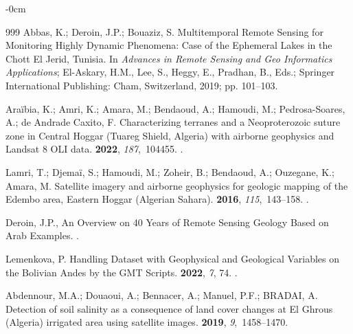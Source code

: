 \documentclass[asi,article,accept,pdftex,moreauthors]{Definitions/mdpi}
\begin{document}
\begin{adjustwidth}{-\extralength}{0cm}
\begin{thebibliography}{999}
Abbas, K.; Deroin, J.P.; Bouaziz, S.
\newblock Multitemporal Remote Sensing for Monitoring Highly Dynamic Phenomena:
  Case of the Ephemeral Lakes in the Chott El Jerid, Tunisia.
\newblock In \emph{Advances in Remote Sensing and Geo Informatics
  Applications}; El-Askary, H.M., Lee, S., Heggy, E., Pradhan, B., Eds.;
  Springer International Publishing: Cham,  Switzerland, 2019; pp. 101--103.

Araïbia, K.; Amri, K.; Amara, M.; Bendaoud, A.; Hamoudi, M.; Pedrosa-Soares,
  A.; {de Andrade Caxito}, F.
\newblock Characterizing terranes and a Neoproterozoic suture zone in Central
  Hoggar (Tuareg Shield, Algeria) with airborne geophysics and Landsat 8 OLI
  data.
 {\bf 2022}, {\em
  187},~104455.
.

Lamri, T.; Djemaï, S.; Hamoudi, M.; Zoheir, B.; Bendaoud, A.; Ouzegane, K.;
  Amara, M.
\newblock Satellite imagery and airborne geophysics for geologic mapping of the
  Edembo area, Eastern Hoggar (Algerian Sahara).
 {\bf 2016}, {\em
  115},~143--158.
.

Deroin, J.P., An Overview on 40 Years of Remote Sensing Geology Based on Arab
  Examples.
\newblock {}
\mbox{.}

Lemenkova, P.
\newblock Handling Dataset with Geophysical and Geological Variables on the
  Bolivian Andes by the GMT Scripts.
 {\bf 2022}, {\em 7}, 74.
.

Abdennour, M.A.; Douaoui, A.; Bennacer, A.; Manuel, P.F.; BRADAI, A.
\newblock Detection of soil salinity as a consequence of land cover changes at
  El Ghrous (Algeria) irrigated area using satellite images.
 {\bf 2019}, {\em 9},~1458--1470.


\end{thebibliography}
\end{adjustwidth}
\end{document}
